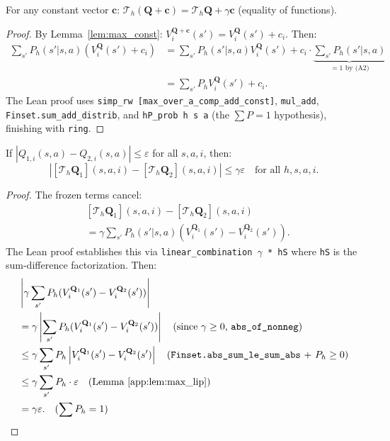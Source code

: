 \begin{lemma}
\label{lem:mode_disc}
For any constant vector $\mathbf{c}$: $\mathcal{T}_h(\mathbf{Q} + \mathbf{c}) = \mathcal{T}_h\mathbf{Q} + \gamma\mathbf{c}$ (equality of functions).
\end{lemma}
\begin{proof}
By Lemma~\ref{lem:max_const}: $V_i^{\mathbf{Q}+\mathbf{c}}(s') = V_i^{\mathbf{Q}}(s') + c_i$.  Then:
\begin{align}
    \sum_{s'} P_h(s'|s,a)(V_i^{\mathbf{Q}}(s') + c_i) &= \sum_{s'} P_h(s'|s,a) V_i^{\mathbf{Q}}(s') + c_i \cdot \underbrace{\sum_{s'} P_h(s'|s,a)}_{=1 \text{ by (A2)}} \\
    &= \sum_{s'} P_h V_i^{\mathbf{Q}}(s') + c_i.
\end{align}
The Lean proof uses \texttt{simp\_rw [max\_over\_a\_comp\_add\_const]}, \texttt{mul\_add}, \texttt{Finset.sum\_add\_distrib}, and \texttt{hP\_prob h s a} (the $\sum P = 1$ hypothesis), finishing with \texttt{ring}.
\end{proof}

\begin{lemma}
\label{app:lem:mode_bound}
If $|Q_{1,i}(s,a) - Q_{2,i}(s,a)| \le \varepsilon$ for all $s,a,i$, then:
\begin{equation}
    |[\mathcal{T}_h \mathbf{Q}_1](s,a,i) - [\mathcal{T}_h \mathbf{Q}_2](s,a,i)| \le \gamma\varepsilon \quad \text{for all } h,s,a,i.
\end{equation}
\end{lemma}
\begin{proof}
The frozen terms cancel:
\begin{align}
    &[\mathcal{T}_h \mathbf{Q}_1](s,a,i) - [\mathcal{T}_h \mathbf{Q}_2](s,a,i) \\
    &= \gamma \sum_{s'} P_h(s'|s,a) (V_i^{\mathbf{Q}_1}(s') - V_i^{\mathbf{Q}_2}(s')).
\end{align}
The Lean proof establishes this via \texttt{linear\_combination $\gamma$ * hS} where \texttt{hS} is the sum-difference factorization.  Then:
\begin{align}
    &\left|\gamma \sum_{s'} P_h (V_i^{\mathbf{Q}_1}(s') - V_i^{\mathbf{Q}_2}(s'))\right| \\
    &= \gamma \left|\sum_{s'} P_h (V_i^{\mathbf{Q}_1}(s') - V_i^{\mathbf{Q}_2}(s'))\right| \quad \text{(since $\gamma \ge 0$, \texttt{abs\_of\_nonneg})} \\
    &\le \gamma \sum_{s'} P_h \left|V_i^{\mathbf{Q}_1}(s') - V_i^{\mathbf{Q}_2}(s')\right| \quad \text{(\texttt{Finset.abs\_sum\_le\_sum\_abs} + $P_h \ge 0$)} \\
    &\le \gamma \sum_{s'} P_h \cdot \varepsilon \quad \text{(Lemma~\ref{app:lem:max_lip})} \\
    &= \gamma\varepsilon. \quad \text{($\sum P_h = 1$)}
\end{align}
\end{proof}

